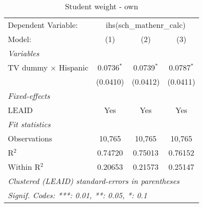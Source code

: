 \begin{table}[htbp]
\centering
\caption{Student weight - own}
\begin{tabular}{lccc}
\tabularnewline\midrule\midrule
Dependent Variable:&\multicolumn{3}{c}{ihs(sch\_mathenr\_calc)}\\
Model:&(1) & (2) & (3)\\
\midrule \emph{Variables}&   &   &  \\
TV dummy $\times$ Hispanic & 0.0736$^{*}$ & 0.0739$^{*}$ & 0.0787$^{*}$\\
  &(0.0410) & (0.0412) & (0.0411)\\
\midrule \emph{Fixed-effects}&   &   &  \\
LEAID & Yes & Yes & Yes\\
\midrule \emph{Fit statistics}&  & & \\
Observations & 10,765&10,765&10,765\\
R$^2$ & 0.74720&0.75013&0.76152\\
Within R$^2$ & 0.20653&0.21573&0.25147\\
\midrule\midrule\multicolumn{4}{l}{\emph{Clustered (LEAID) standard-errors in parentheses}}\\
\multicolumn{4}{l}{\emph{Signif. Codes: ***: 0.01, **: 0.05, *: 0.1}}\\
\end{tabular}
\end{table}


